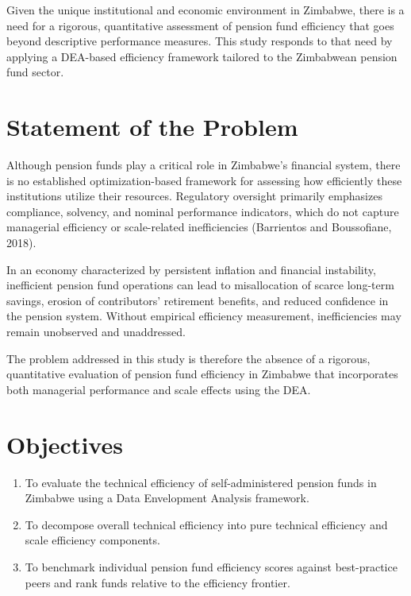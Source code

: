 \documentclass[12pt,a4paper]{article}
\begin{document}
Given the unique institutional and economic environment in Zimbabwe, there is a need for a rigorous, quantitative assessment of pension fund efficiency that goes beyond descriptive performance measures. This study responds to that need by applying a DEA-based efficiency framework tailored to the Zimbabwean pension fund sector.

\section{Statement of the Problem}

Although pension funds play a critical role in Zimbabwe's financial system, there is no established optimization-based framework for assessing how efficiently these institutions utilize their resources. Regulatory oversight primarily emphasizes compliance, solvency, and nominal performance indicators, which do not capture managerial efficiency or scale-related inefficiencies (Barrientos and Boussofiane, 2018).

In an economy characterized by persistent inflation and financial instability, inefficient pension fund operations can lead to misallocation of scarce long-term savings, erosion of contributors' retirement benefits, and reduced confidence in the pension system. Without empirical efficiency measurement, inefficiencies may remain unobserved and unaddressed.

The problem addressed in this study is therefore the absence of a rigorous, quantitative evaluation of pension fund efficiency in Zimbabwe that incorporates both managerial performance and scale effects using the DEA.

\section{Objectives}

\begin{enumerate}[noitemsep]
    \item To evaluate the technical efficiency of self-administered pension funds in Zimbabwe using a Data Envelopment Analysis framework.
    \item To decompose overall technical efficiency into pure technical efficiency and scale efficiency components.
    \item To benchmark individual pension fund efficiency scores against best-practice peers and rank funds relative to the efficiency frontier.
\end{enumerate}
\end{document}
